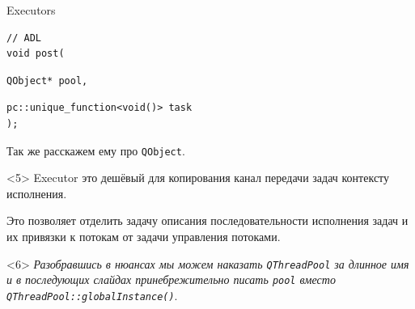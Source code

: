 \documentclass[aspectratio=169,hyperref={unicode},17pt]{beamer}
\begin{document}
\begin{frame}[fragile,t]{Executors}
\begin{onlyenv}
\begin{lstlisting}[style=cppcode,aboveskip=0pt,belowskip=0pt]
// ADL
void post(
\end{lstlisting}
\begin{lstlisting}[style=cppcode,backgroundcolor=\color{gray!30},aboveskip=0pt,belowskip=0pt]
  QObject* pool,
\end{lstlisting}
\begin{lstlisting}[style=cppcode,aboveskip=0pt,belowskip=0pt]
  pc::unique_function<void()> task
);
\end{lstlisting}
Так же расскажем ему про \texttt{QObject}.
\end{onlyenv}
\begin{onlyenv}<5>
Executor это дешёвый для копирования канал передачи задач контексту исполнения.

Это позволяет отделить задачу описания последовательности исполнения задач и их привязки к потокам от задачи управления
потоками.
\end{onlyenv}
\begin{onlyenv}<6>
\textit{\footnotesize{Разобравшись в нюансах мы можем наказать \texttt{QThreadPool} за длинное имя и в последующих слайдах принебрежительно писать \texttt{pool} вместо \texttt{QThreadPool::globalInstance()}}}.
\end{onlyenv}
\end{frame}
\end{document}
